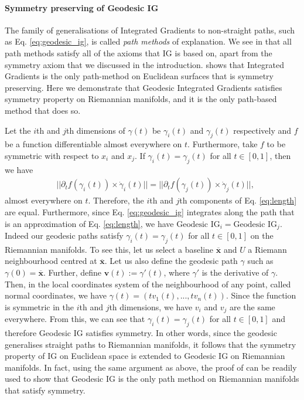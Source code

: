 \paragraph{Symmetry preserving of Geodesic IG}

The family of generalisations of Integrated Gradients to non-straight paths, such as Eq. \ref{eq:geodesic_ig}, is called \emph{path methods} of explanation. We see in \citet{sundararajan2017axiomatic} that all path methods satisfy all of the axioms that IG is based on, apart from the symmetry axiom that we discussed in the introduction. \citet[Theorem 1]{sundararajan2017axiomatic} shows that Integrated Gradients is the only path-method on Euclidean surfaces that is symmetry preserving. Here we demonstrate that Geodesic Integrated Gradients satisfies symmetry property on Riemannian manifolds, and it is the only path-based method that does so. 

Let the $i$th and $j$th dimensions of $\gamma(t)$ be $\gamma_i(t)$ and $\gamma_j(t)$ respectively and $f$ be a function differentiable almost everywhere on $t$. Furthermore, take $f$ to be symmetric with respect to $x_i$ and $x_j$. If $\gamma_i(t) = \gamma_j(t)$ for all $t \in [0,1]$, then we have 
\begin{equation}
	\begin{split}
		& ||\partial_t f(\gamma_i(t)) \times \dot\gamma_i(t)|| = ||\partial_t f(\gamma_j(t)) \times \dot\gamma_j(t)||,
	\end{split}
	\label{eq:norms}
\end{equation}
almost everywhere on $t$. Therefore, the $i$th and $j$th components of Eq. \ref{eq:length} are equal. Furthermore, since  Eq. \ref{eq:geodesic_ig} integrates along the path that is an approximation of Eq. \ref{eq:length}, we have $\textrm{Geodesic IG}_i = \textrm{Geodesic IG}_j$. Indeed our geodesic paths satisfy  $\gamma_i(t) = \gamma_j(t)$ for all $t \in [0,1]$ on the Riemannian manifolds. To see this, let us select a baseline $\overline{\textbf{x}}$ and $U$ a Riemann neighbourhood centred at $\overline{\textbf{x}}$. Let us also define the geodesic path $\gamma$ such as $\gamma(0) = \overline{\textbf{x}}$. Further, define $\textbf{v}(t):=\gamma'(t)$, where $\gamma'$ is the derivative of $\gamma$. Then, in the local coordinates system of the neighbourhood of any point, called normal coordinates, we have $\gamma(t) = (tv_1(t), ..., tv_n(t))$. Since the function is symmetric in the $i$th and $j$th dimensions, we have $v_i$ and $v_j$ are the same everywhere. From this, we can see that $\gamma_i(t) = \gamma_j(t)$ for all $t \in [0,1]$ and therefore Geodesic IG satisfies symmetry. In other words, since the geodesic generalises straight paths to Riemannian manifolds, it follows that the symmetry property of IG on Euclidean space is extended to Geodesic IG on Riemannian manifolds. In fact, using the same argument as above, the proof of \citet[Theorem 1]{sundararajan2017axiomatic} can be readily used to show that Geodesic IG is the only path method on Riemannian manifolds that satisfy symmetry.

